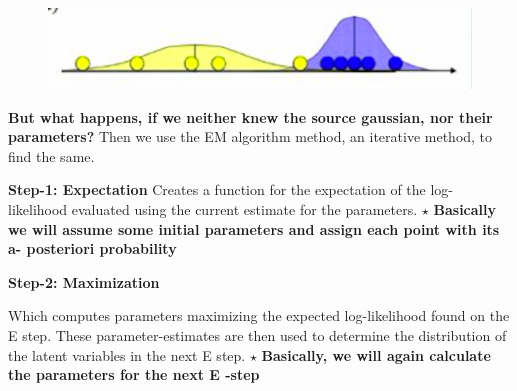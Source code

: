 \documentclass[11pt]{beamer}
\begin{document}
\begin{frame}
\begin{figure}
\includegraphics[scale=.3]{pic2.png}
\end{figure}
\textbf{But what happens, if we neither knew the source gaussian, nor their parameters?}\linebreak\linebreak
\textsf{Then we use the EM algorithm method, an iterative method, to find the same.}
\end{frame}


\begin{frame}
\textbf{Step-1: Expectation}\linebreak
\linebreak
\textsf{Creates a function for the expectation of the log-likelihood evaluated using the
current estimate for the parameters.}\linebreak
$\star$
\textbf{ Basically we will assume some initial parameters and assign each point with its a- posteriori probability}
\linebreak
\linebreak
\linebreak

\textbf{Step-2: Maximization}
\linebreak

\textsf{Which computes parameters maximizing the expected log-likelihood found on the
E step. These parameter-estimates are then used to determine the distribution of
the latent variables in the next E step.}\linebreak
$\star$
\textbf{ Basically, we will again calculate the parameters for the next E -step }

\end{frame}
\end{document}
